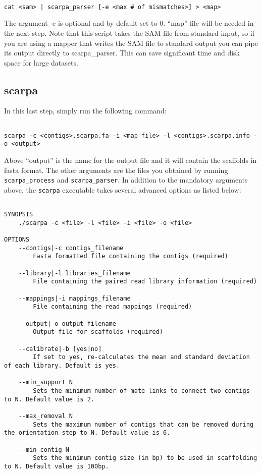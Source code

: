 \documentclass[12pt,a4paper]{report}
\begin{document}
\begin{lstlisting}

cat <sam> | scarpa_parser [-e <max # of mismatches>] > <map>

\end{lstlisting}

The argument -e is optional and by default set to 0. ``map'' file will be needed in the next step. Note that this script takes the SAM file from standard input, so if you are using a mapper that writes the SAM file to standard output you can pipe its output directly to scarpa\_parser. This can save significant time and disk space for large datasets.

\subsection{scarpa}

In this last step, simply run the following command:

\begin{lstlisting}

scarpa -c <contigs>.scarpa.fa -i <map file> -l <contigs>.scarpa.info -o <output>

\end{lstlisting}

Above ``output'' is the name for the output file and it will contain the scaffolds in fasta format. The other arguments are the files you obtained by running \texttt{scarpa\_process} and \texttt{scarpa\_parser}. In addition to the mandatory arguments above, the \texttt{scarpa} executable takes several advanced options as listed below:

\begin{lstlisting}

SYNOPSIS
    ./scarpa -c <file> -l <file> -i <file> -o <file> 

OPTIONS 
    --contigs|-c contigs_filename 
        Fasta formatted file containing the contigs (required) 

    --library|-l libraries_filename 
        File containing the paired read library information (required) 

    --mappings|-i mappings_filename 
        File containing the read mappings (required) 

    --output|-o output_filename 
        Output file for scaffolds (required) 

    --calibrate|-b [yes|no] 
        If set to yes, re-calculates the mean and standard deviation of each library. Default is yes. 

    --min_support N 
        Sets the minimum number of mate links to connect two contigs to N. Default value is 2. 

    --max_removal N 
        Sets the maximum number of contigs that can be removed during the orientation step to N. Default value is 6. 

    --min_contig N 
        Sets the minimum contig size (in bp) to be used in scaffolding to N. Default value is 100bp. 

\end{lstlisting}
\end{document}
